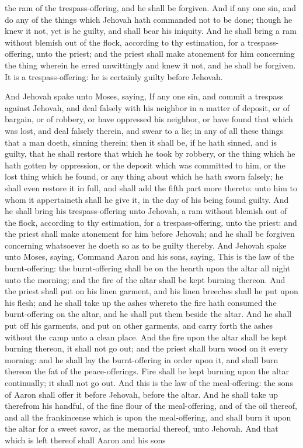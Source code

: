 the ram of the trespass-offering, and he shall be forgiven.  And if any one sin, and do any of the things which Jehovah hath commanded not to be done; though he knew it not, yet is he guilty, and shall bear his iniquity. And he shall bring a ram without blemish out of the flock, according to thy estimation, for a trespass-offering, unto the priest; and the priest shall make atonement for him concerning the thing wherein he erred unwittingly and knew it not, and he shall be forgiven. It is a trespass-offering: he is certainly guilty before Jehovah. 

And Jehovah spake unto Moses, saying, If any one sin, and commit a trespass against Jehovah, and deal falsely with his neighbor in a matter of deposit, or of bargain, or of robbery, or have oppressed his neighbor, or have found that which was lost, and deal falsely therein, and swear to a lie; in any of all these things that a man doeth, sinning therein; then it shall be, if he hath sinned, and is guilty, that he shall restore that which he took by robbery, or the thing which he hath gotten by oppression, or the deposit which was committed to him, or the lost thing which he found, or any thing about which he hath sworn falsely; he shall even restore it in full, and shall add the fifth part more thereto: unto him to whom it appertaineth shall he give it, in the day of his being found guilty. And he shall bring his trespass-offering unto Jehovah, a ram without blemish out of the flock, according to thy estimation, for a trespass-offering, unto the priest: and the priest shall make atonement for him before Jehovah; and he shall be forgiven concerning whatsoever he doeth so as to be guilty thereby.  And Jehovah spake unto Moses, saying, Command Aaron and his sons, saying, This is the law of the burnt-offering: the burnt-offering shall be on the hearth upon the altar all night unto the morning; and the fire of the altar shall be kept burning thereon. And the priest shall put on his linen garment, and his linen breeches shall he put upon his flesh; and he shall take up the ashes whereto the fire hath consumed the burnt-offering on the altar, and he shall put them beside the altar. And he shall put off his garments, and put on other garments, and carry forth the ashes without the camp unto a clean place. And the fire upon the altar shall be kept burning thereon, it shall not go out; and the priest shall burn wood on it every morning: and he shall lay the burnt-offering in order upon it, and shall burn thereon the fat of the peace-offerings. Fire shall be kept burning upon the altar continually; it shall not go out.  And this is the law of the meal-offering: the sons of Aaron shall offer it before Jehovah, before the altar. And he shall take up therefrom his handful, of the fine flour of the meal-offering, and of the oil thereof, and all the frankincense which is upon the meal-offering, and shall burn it upon the altar for a sweet savor, as the memorial thereof, unto Jehovah. And that which is left thereof shall Aaron and his sons 